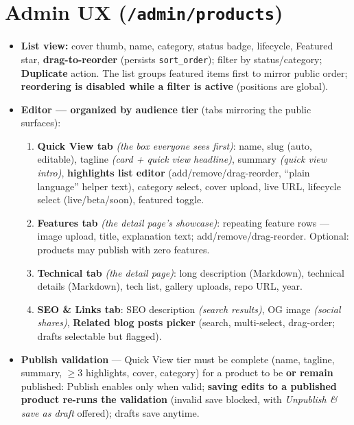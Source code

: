 \documentclass[11pt,a4paper]{article}
\begin{document}
\section{Admin UX (\texttt{/admin/products})}
\begin{itemize}
  \item \textbf{List view:} cover thumb, name, category, status badge, lifecycle, Featured
        star, \textbf{drag-to-reorder} (persists \texttt{sort\_order}); filter by
        status/category; \textbf{Duplicate} action. The list groups featured items first to
        mirror public order; \textbf{reordering is disabled while a filter is active}
        (positions are global).
  \item \textbf{Editor --- organized by audience tier} (tabs mirroring the public surfaces):
    \begin{enumerate}
      \item \textbf{Quick View tab} \emph{(the box everyone sees first)}: name, slug (auto,
            editable), tagline \emph{(card + quick view headline)}, summary \emph{(quick view
            intro)}, \textbf{highlights list editor} (add/remove/drag-reorder, ``plain
            language'' helper text), category select, cover upload, live URL, lifecycle
            select (live/beta/soon), featured toggle.
      \item \textbf{Features tab} \emph{(the detail page's showcase)}: repeating feature
            rows --- image upload, title, explanation text; add/remove/drag-reorder.
            Optional: products may publish with zero features.
      \item \textbf{Technical tab} \emph{(the detail page)}: long description (Markdown),
            technical details (Markdown), tech list, gallery uploads, repo URL, year.
      \item \textbf{SEO \& Links tab}: SEO description \emph{(search results)}, OG image
            \emph{(social shares)}, \textbf{Related blog posts picker} (search, multi-select,
            drag-order; drafts selectable but flagged).
    \end{enumerate}
  \item \textbf{Publish validation} --- Quick View tier must be complete (name, tagline,
        summary, $\geq$3 highlights, cover, category) for a product to be \textbf{or remain}
        published: Publish enables only when valid; \textbf{saving edits to a published
        product re-runs the validation} (invalid save blocked, with \emph{Unpublish \& save
        as draft} offered); drafts save anytime.

\end{itemize}
\end{document}
